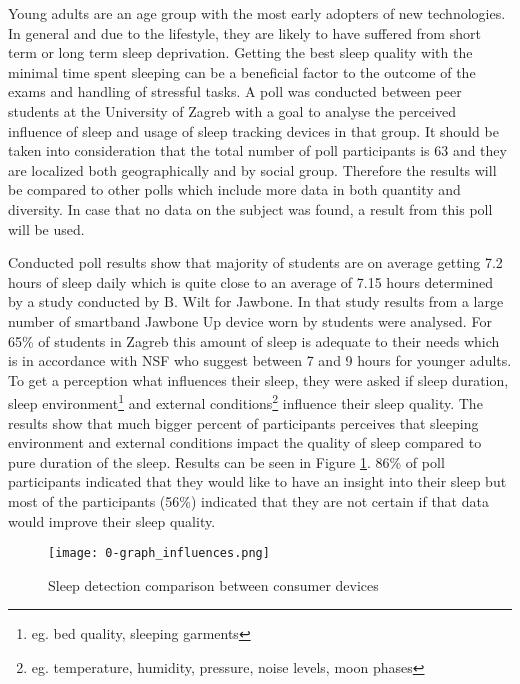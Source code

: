 Young adults are an age group with the most early adopters of new technologies. In general and due to the lifestyle, they are likely to have suffered from short term or long term sleep deprivation. Getting the best sleep quality with the minimal time spent sleeping can be a beneficial factor to the outcome of the exams and handling of stressful tasks. A poll was conducted between peer students at the University of Zagreb with a goal to analyse the perceived influence of sleep and usage of sleep tracking devices in that group. It should be taken into consideration that the total number of poll participants is 63 and they are localized both geographically and by social group. Therefore the results will be compared to other polls which include more data in both quantity and diversity. In case that no data on the subject was found, a result from this poll will be used.

Conducted poll results show that majority of students are on average getting 7.2 hours of sleep daily which is quite close to an average of 7.15 hours determined by a study conducted by B. Wilt for Jawbone\cite{Jawbone}. In that study results from a large number of smartband Jawbone Up device worn by students were analysed. For 65\% of students in Zagreb this amount of sleep is adequate to their needs which is in accordance with NSF who suggest between 7 and 9 hours for younger adults\cite{NSF}. To get a perception what influences their sleep, they were asked if sleep duration, sleep environment\footnote{eg. bed quality, sleeping garments} and external conditions\footnote{eg. temperature, humidity, pressure, noise levels, moon phases} influence their sleep quality. The results show that much bigger percent of participants perceives that sleeping environment and external conditions impact the quality of sleep compared to pure duration of the sleep. Results can be seen in Figure \ref{fig:influence}. 86\% of poll participants indicated that they would like to have an insight into their sleep but most of the participants (56\%) indicated that they are not certain if that data would improve their sleep quality.

\begin{figure}[h]
  \begin{center}
    \texttt{[image: 0-graph\_influences.png]}
  \end{center}
  \caption{Sleep detection comparison between consumer devices}
  \label{fig:influence}
\end{figure}

